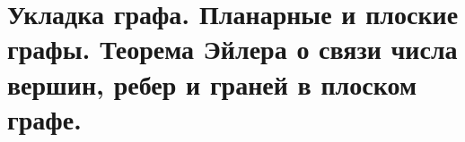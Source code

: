 \section{Укладка графа. Планарные и плоские графы. Теорема Эйлера о связи числа вершин, ребер и 
граней в плоском графе.}

